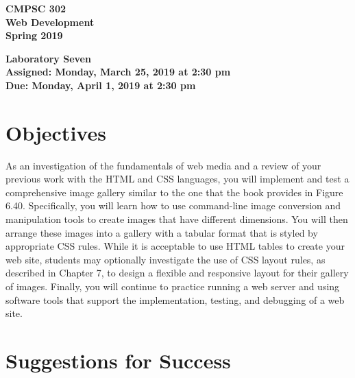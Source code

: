 \documentclass[11pt]{article}
\newcommand{\assignmentduedate}{April 1}
\newcommand{\assignmentassignedate}{March 25}
\newcommand{\assignmentnumber}{Seven}
\newcommand{\labyear}{2019}
\newcommand{\labday}{Monday}
\newcommand{\labtime}{2:30 pm}
\newcommand{\assigneddate}{Assigned: \labday, \assignmentassignedate, \labyear{} at \labtime{}}
\newcommand{\duedate}{Due: \labday, \assignmentduedate, \labyear{} at \labtime{}}
\newcommand{\labtitle}[1]
{
  \begin{center}
    \begin{center}
      \bf
      CMPSC 302\\Web Development\\
      Spring 2019\\
      \medskip
    \end{center}
    \bf
    #1
  \end{center}
}
\begin{document}
\thispagestyle{empty}

\labtitle{Laboratory \assignmentnumber{} \\ \assigneddate{} \\ \duedate{}}

\section*{Objectives}

As an investigation of the fundamentals of web media and a review of your
previous work with the HTML and CSS languages, you will implement and test a
comprehensive image gallery similar to the one that the book provides in Figure
6.40. Specifically, you will learn how to use command-line image conversion and
manipulation tools to create images that have different dimensions. You will
then arrange these images into a gallery with a tabular format that is styled by
appropriate CSS rules. While it is acceptable to use HTML tables to create your
web site, students may optionally investigate the use of CSS layout rules, as
described in Chapter 7, to design a flexible and responsive layout for their
gallery of images. Finally, you will continue to practice running a web server
and using software tools that support the implementation, testing, and debugging
of a web site.

\section*{Suggestions for Success}
\end{document}
